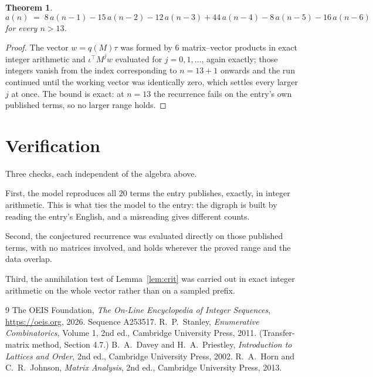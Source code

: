 \documentclass[11pt,a4paper]{article}
\theoremstyle{plain}
\newtheorem{theorem}{Theorem}
\theoremstyle{definition}
\begin{document}
\begin{theorem}
\[
a(n)\;=\;8\,a(n-1) - 15\,a(n-2) - 12\,a(n-3) + 44\,a(n-4) - 8\,a(n-5) - 16\,a(n-6)
\]
for every $n>13$.
\end{theorem}

\begin{proof}
The vector $w=q(M)\tau$ was formed by $6$ matrix--vector products in exact integer
arithmetic and $\iota^{\!\top}M^{j}w$ evaluated for $j=0,1,\dots$, again exactly; those
integers vanish from the index corresponding to $n=13+1$ onwards and the run continued
until the working vector was identically zero, which settles every larger $j$ at once. The bound is exact: at $n=13$ the recurrence fails on the entry's own published terms, so no larger range holds.
\end{proof}

\section{Verification}

Three checks, each independent of the algebra above.

First, the model reproduces all $20$ terms the entry publishes, exactly, in integer
arithmetic. This is what ties the model to the entry: the digraph is built by reading the
entry's English, and a misreading gives different counts.

Second, the conjectured recurrence was evaluated directly on those published terms, with no
matrices involved, and holds wherever the proved range and the data overlap.

Third, the annihilation test of Lemma~\ref{lem:crit} was carried out in exact integer
arithmetic on the whole vector rather than on a sampled prefix.

\begin{thebibliography}{9}
 The OEIS Foundation, \emph{The On-Line Encyclopedia of Integer
Sequences}, \url{https://oeis.org}, 2026. Sequence A253517.
 R.~P.~Stanley, \emph{Enumerative Combinatorics}, Volume 1, 2nd ed.,
Cambridge University Press, 2011. (Transfer-matrix method, Section 4.7.)
 B.~A.~Davey and H.~A.~Priestley, \emph{Introduction to Lattices and
Order}, 2nd ed., Cambridge University Press, 2002.
 R.~A.~Horn and C.~R.~Johnson, \emph{Matrix Analysis}, 2nd ed., Cambridge
University Press, 2013.
\end{thebibliography}
\end{document}
